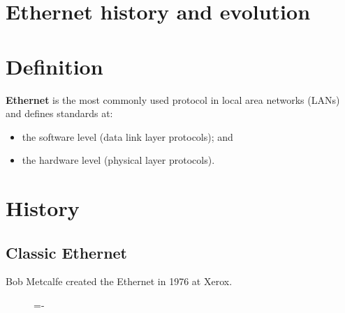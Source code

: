 \documentclass[a4paper]{systems-software}
\begin{document}
\newpage

\section{Ethernet history and evolution}

\section*{Definition}

\textbf{Ethernet} is the most commonly used protocol in local area networks (LANs) and defines standards at:
\begin{itemize}
	\item the software level (data link layer protocols); and
	\item the hardware level (physical layer protocols).
\end{itemize}


\section*{History}

\subsection*{Classic Ethernet}

Bob Metcalfe created the Ethernet in 1976 at Xerox.

\begin{figure}[H]
	\lineskip=-\fboxrule
\end{figure}
\end{document}
